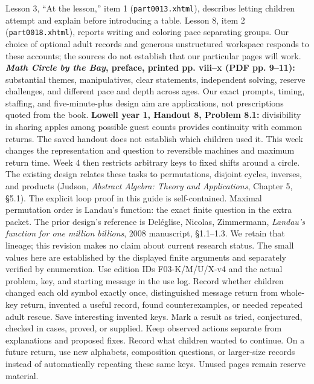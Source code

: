 \documentclass[11pt]{article}
\begin{document}
Lesson 3, ``At the lesson,'' item 1 (\texttt{part0013.xhtml}), describes letting children attempt and explain before introducing a table. Lesson 8, item 2 (\texttt{part0018.xhtml}), reports writing and coloring pace separating groups. Our choice of optional adult records and generous unstructured workspace responds to these accounts; the sources do not establish that our particular pages will work.
\textbf{\emph{Math Circle by the Bay}, preface, printed pp. viii--x (PDF pp. 9--11):} substantial themes, manipulatives, clear statements, independent solving, reserve challenges, and different pace and depth across ages. Our exact prompts, timing, staffing, and five-minute-plus design aim are applications, not prescriptions quoted from the book.
\textbf{Lowell year 1, Handout 8, Problem 8.1:} divisibility in sharing apples among possible guest counts provides continuity with common returns. The saved handout does not establish which children used it. This week changes the representation and question to reversible machines and maximum return time. Week 4 then restricts arbitrary keys to fixed shifts around a circle.
The existing design relates these tasks to permutations, disjoint cycles, inverses, and products (Judson, \emph{Abstract Algebra: Theory and Applications}, Chapter 5, \S5.1). The explicit loop proof in this guide is self-contained.
Maximal permutation order is Landau's function: the exact finite question in the extra packet. The prior design's reference is Del\'eglise, Nicolas, Zimmermann, \emph{Landau's function for one million billions}, 2008 manuscript, \S1.1--1.3. We retain that lineage; this revision makes no claim about current research status. The small values here are established by the displayed finite arguments and separately verified by enumeration.
Use edition IDs F03-K/M/U/X-v4 and the actual problem, key, and starting message in the use log. Record whether children changed each old symbol exactly once, distinguished message return from whole-key return, invented a useful record, found counterexamples, or needed repeated adult rescue. Save interesting invented keys. Mark a result as tried, conjectured, checked in cases, proved, or supplied.
Keep observed actions separate from explanations and proposed fixes. Record what children wanted to continue. On a future return, use new alphabets, composition questions, or larger-size records instead of automatically repeating these same keys. Unused pages remain reserve material.
\end{document}

